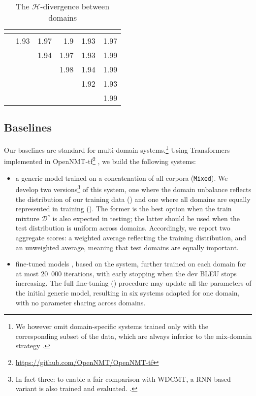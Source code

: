\begin{table}\centering
  \begin{tabular}{|l*{5}{|r}|} 
   &  &  &  &  &  \\ \hline
     &1.93 &1.97 &1.9 &1.93 &1.97 \\
       && 1.94 & 1.97 &1.93 & 1.99 \\
     &&&1.98 &1.94 &1.99 \\
       &&&&1.92 &1.93 \\
          &&&&& 1.99 \\ \hline
  \end{tabular}
  \caption{The $\mathcal{H}$-divergence between domains}
  \label{tab:domaindist}
\end{table}

\subsection{Baselines \label{ssec:baselines}}

Our baselines are standard for multi-domain systems.\footnote{We however omit domain-specific systems trained only with the corresponding subset of the data, which are always inferior to the mix-domain strategy \cite{Britz17effective}.} Using Transformers \cite{Vaswani17attention} implemented in OpenNMT-tf\footnote{\url{https://github.com/OpenNMT/OpenNMT-tf}} \cite{Klein17opennmt}, we build the following systems:

\begin{itemize}
\item a generic model trained on a concatenation of all corpora (\texttt{Mixed}). We develop two versions\footnote{In fact three: to enable a fair comparison with WDCMT, a RNN-based variant is also trained and evaluated. .} of this system, one where the domain unbalance reflects the distribution of our training data  () and one where all domains are equally represented in training (). The former is the best option when the train mixture $\mathcal{D}^s$ is also expected in testing; the latter should be used when the test distribution is uniform across domains. Accordingly, we report two aggregate scores: a weighted average reflecting the training distribution, and an unweighted average, meaning that test domains are equally important.
\item fine-tuned models \cite{Luong15stanford,Freitag16fast}, based on the  system, further trained on each domain for at most 20~000 iterations, with early stopping when the dev BLEU stops increasing. The full fine-tuning () procedure may update all the parameters of the initial generic model, resulting in six systems adapted for one domain, with no parameter sharing across domains.
\end{itemize}

